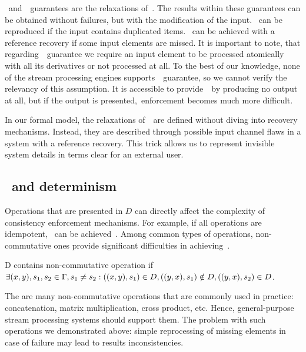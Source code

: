 \Amo\ and~\alo\ guarantees are the relaxations of~\eo. The results within these guarantees can be obtained without failures, but with the modification of the input. \Alo\ can be reproduced if the input contains duplicated items. \Amo\ can be achieved with a reference recovery if some input elements are missed. It is important to note, that regarding~\amo\ guarantee we require an input element to be processed atomically with all its derivatives or not processed at all. To the best of our knowledge, none of the stream processing engines supports~\amo\ guarantee, so we cannot verify the relevancy of this assumption. It is accessible to provide~\amo\ by producing no output at all, but if the output is presented,\amo\ enforcement becomes much more difficult.  

In our formal model, the relaxations of~\eo\ are defined without diving into recovery mechanisms. Instead, they are described through possible input channel flaws in a system with a reference recovery. This trick allows us to represent invisible system details in terms clear for an external user.

\subsection{\Eo\ and determinism}

Operations that are presented in $D$ can directly affect the complexity of consistency enforcement mechanisms. For example, if all operations are idempotent, \eo\ can be achieved~\cite{Akidau:2013:MFS:2536222.2536229}. Among common types of operations, non-commutative ones provide significant difficulties in achieving~\eo.

\begin{definition}{D contains non-commutative operation}
if\\ 
$\exists (x,y), s_1, s_2 \in \Gamma, s_1 \neq s_2: \\ ((x,y),s_1)\in D, \\ ((y,x),s_1)\notin D, \\ ((y,x),s_2)\in D$.
\end{definition}

The are many non-commutative operations that are commonly used in practice: concatenation, matrix multiplication, cross product, etc. Hence, general-purpose stream processing systems should support them. The problem with such operations we demonstrated above: simple reprocessing of missing elements in case of failure may lead to results inconsistencies.

